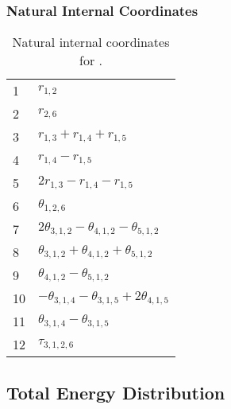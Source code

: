 \documentclass[10pt,oneside]{article}
\begin{document}
\begin{table}[h!]
\subsubsection*{Natural Internal Coordinates}
\centering
\caption{Natural internal coordinates for .}
\small
\begin{tabular}{ll}
\toprule
  1   & $r_{1,2}$ \\
  2   & $r_{2,6}$ \\
  3   & $r_{1,3} + r_{1,4} + r_{1,5}$ \\
  4   & $r_{1,4} - r_{1,5}$ \\
  5   & $2r_{1,3} - r_{1,4} - r_{1,5}$ \\
  6   & $\theta_{1,2,6}$ \\
  7   & $2\theta_{3,1,2} - \theta_{4,1,2} - \theta_{5,1,2}$ \\
  8   & $\theta_{3,1,2} + \theta_{4,1,2} + \theta_{5,1,2}$ \\
  9   & $\theta_{4,1,2} - \theta_{5,1,2}$ \\
  10  & $-\theta_{3,1,4} - \theta_{3,1,5} + 2\theta_{4,1,5}$ \\
  11  & $\theta_{3,1,4} - \theta_{3,1,5}$ \\
  12  & $\tau_{3,1,2,6}$ \\
\bottomrule
\end{tabular}
\end{table}

\begin{table}
\subsection*{Total Energy Distribution}
\centering\end{table}

\clearpage

\subsection{}
\end{document}
